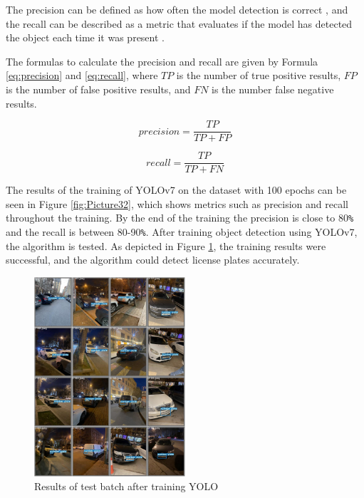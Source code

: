 \documentclass[conference]{IEEEtran}
\begin{document}
The precision can be defined as how often the model detection is correct , and the recall can be described as a metric that evaluates if the model has detected the object each time it was present \cite{b2}.

The formulas to calculate the precision and recall are given by Formula \ref{eq:precision} and \ref{eq:recall}, where $TP$ is the number of true positive results, $FP$ is the number of false positive results, and $FN$ is the number false negative results.

\begin{equation}
    precision = \frac{TP}{TP + FP}
    \label{eq:precision}
\end{equation}

\begin{equation}
    recall = \frac{TP}{TP + FN}
    \label{eq:recall}
\end{equation}

The results of the training of YOLOv7 on the dataset with 100 epochs can be seen in Figure \ref{fig:Picture32}, which shows metrics such as precision and recall throughout the training. By the end of the training the precision is close to 80\verb|%| and the recall is between 80-90\verb|%|. After training object detection using YOLOv7, the algorithm is tested. As depicted in Figure \ref{fig:Picture33}, the training results were successful, and the algorithm could detect license plates accurately. 

\begin{figure}[h]
    \centering
    \includegraphics[width=0.5\textwidth]{images/Picture33.png}
    \caption{Results of test batch after training YOLO}
    \label{fig:Picture33}
\end{figure}
\end{document}
